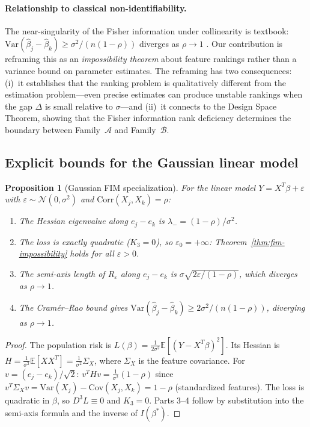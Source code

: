 \documentclass{article}
\newcommand{\Var}{\mathrm{Var}}
\newtheorem{proposition}[theorem]{Proposition}
\begin{document}
\paragraph{Relationship to classical non-identifiability.}
The near-singularity of the Fisher information under collinearity is
textbook: $\Var(\hat\beta_j - \hat\beta_k) \geq \sigma^2/(n(1-\rho))$
diverges as $\rho \to 1$ \cite{lehmann2005testing}. Our contribution is
reframing this as an \emph{impossibility theorem} about feature rankings
rather than a variance bound on parameter estimates. The reframing has
two consequences: (i)~it establishes that the ranking problem is
qualitatively different from the estimation problem---even precise
estimates can produce unstable rankings when the gap $\Delta$ is small
relative to $\sigma$---and (ii)~it connects to the Design Space Theorem,
showing that the Fisher information rank deficiency determines the
boundary between Family~$\mathcal{A}$ and Family~$\mathcal{B}$.

\subsection{Explicit bounds for the Gaussian linear model}

\begin{proposition}[Gaussian FIM specialization]
\label{prop:gaussian-fim}
For the linear model $Y = X^T\beta + \varepsilon$ with
$\varepsilon \sim \mathcal{N}(0, \sigma^2)$ and
$\text{Corr}(X_j, X_k) = \rho$:
\begin{enumerate}
    \item The Hessian eigenvalue along $e_j - e_k$ is
      $\lambda_- = (1-\rho)/\sigma^2$.
    \item The loss is exactly quadratic ($K_3 = 0$), so
      $\varepsilon_0 = +\infty$: Theorem~\ref{thm:fim-impossibility}
      holds for \emph{all} $\varepsilon > 0$.
    \item The semi-axis length of $R_\varepsilon$ along $e_j - e_k$
      is $\sigma\sqrt{2\varepsilon/(1-\rho)}$, which diverges as
      $\rho \to 1$.
    \item The Cram\'er--Rao bound gives
      $\Var(\hat\beta_j - \hat\beta_k) \geq
      2\sigma^2 / (n(1-\rho))$,
      diverging as $\rho \to 1$.
\end{enumerate}
\end{proposition}

\begin{proof}
The population risk is $L(\beta) = \frac{1}{2\sigma^2}\mathbb{E}[(Y-X^T\beta)^2]$.
Its Hessian is $H = \frac{1}{\sigma^2}\mathbb{E}[XX^T] =
\frac{1}{\sigma^2}\Sigma_X$, where $\Sigma_X$ is the feature
covariance. For $v = (e_j - e_k)/\sqrt{2}$:
$v^T H v = \frac{1}{\sigma^2}(1 - \rho)$ since
$v^T \Sigma_X v = \Var(X_j) - \text{Cov}(X_j,X_k) = 1 - \rho$
(standardized features). The loss is quadratic in $\beta$, so
$D^3 L \equiv 0$ and $K_3 = 0$. Parts 3--4 follow by
substitution into the semi-axis formula and the inverse of
$I(\beta^*)$.
\end{proof}
\end{document}
